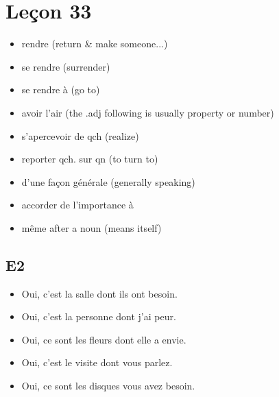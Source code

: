 \documentclass{book}
\begin{document}
\chapter{Leçon 33}
    \begin{itemize}
        \item rendre (return \& make someone...)
        \item se rendre (surrender)
        \item se rendre à (go to)
        \item avoir l'air (the .adj following is usually property or number)
        \item s'apercevoir de qch (realize)
        \item reporter qch. sur qn (to turn to)
        \item d'une façon générale (generally speaking)
        \item accorder de l'importance à %
        \item même after a noun (means itself)
    \end{itemize}

    \section{E2}
        \begin{itemize}
            \item Oui, c'est la salle dont ils ont besoin.
            \item Oui, c'est la personne dont j'ai peur.
            \item Oui, ce sont les fleurs dont elle a envie.
            \item Oui, c'est le visite dont vous parlez.
            \item Oui, ce sont les disques vous avez besoin.
        \end{itemize}
\end{document}
